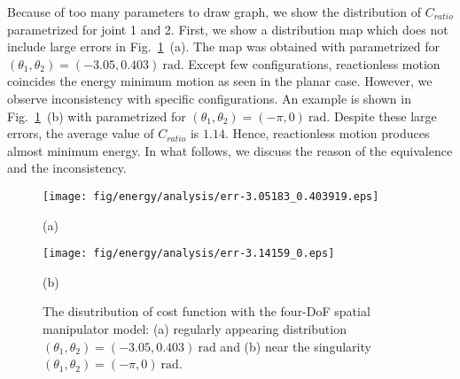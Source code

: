 \documentclass[preprint,12pt]{elsarticle}
\def\fig#1{{Fig.~\ref{fig:#1}}}
\def\unit#1{{~\mathrm{#1}}}
\begin{document}
Because of too many parameters to draw graph,
we show the distribution of $C_{ratio}$ parametrized for joint 1 and 2.
First, we show a distribution map which does not include large errors in \fig{dist_3d}~(a).
The map was obtained with parametrized for $(\theta_{1}, \theta_{2}) = (-3.05,0.403)\unit{rad}$.
Except few configurations,
reactionless motion coincides the energy minimum motion as seen in the planar case.
However, we observe inconsistency with specific configurations.
An example is shown in \fig{dist_3d}~(b) with parametrized for $(\theta_{1},\theta_{2}) = (-\pi,0)\unit{rad}$.
Despite these large errors,
the average value of $C_{ratio}$ is $1.14$.
Hence, reactionless motion produces almost minimum energy.
In what follows, we discuss the reason of the equivalence and the inconsistency.
%
\begin{figure}[t]
  \centering
  \begin{minipage}[t]{0.495\linewidth}
    \centering
    \texttt{[image: fig/energy/analysis/err-3.05183\_0.403919.eps]}
    \footnotesize\par{(a)}
  \end{minipage}
  \begin{minipage}[t]{0.495\linewidth}
    \centering
    \texttt{[image: fig/energy/analysis/err-3.14159\_0.eps]}
    \footnotesize\par{(b)}
  \end{minipage}
  \caption{The disutribution of cost function with the four-DoF spatial manipulator model:
  (a) regularly appearing distribution $(\theta_{1},\theta_{2}) = (-3.05,0.403)\unit{rad}$
  and (b) near the singularity $(\theta_{1},\theta_{2}) = (-\pi,0)\unit{rad}$.}
\label{fig:dist_3d}
\end{figure}
%

\end{document}
